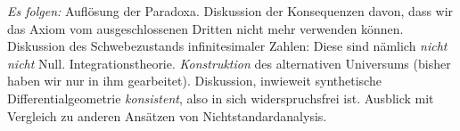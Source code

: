 \documentclass[twoside]{../zirkelblatt}
\theoremstyle{definition}
\theoremstyle{plain}
\theoremstyle{remark}
\begin{document}
\vfill

\emph{Es folgen:} Auflösung der Paradoxa. Diskussion der Konsequenzen davon,
dass wir das Axiom vom ausgeschlossenen Dritten nicht mehr verwenden können.
Diskussion des Schwebezustands infinitesimaler Zahlen: Diese sind nämlich
\emph{nicht nicht} Null. Integrationstheorie. \emph{Konstruktion} des
alternativen Universums (bisher haben wir nur in ihm gearbeitet). Diskussion,
inwieweit synthetische Differentialgeometrie \emph{konsistent}, also in
sich widerspruchsfrei ist. Ausblick mit Vergleich zu anderen Ansätzen von
Nichtstandardanalysis.
\end{document}
